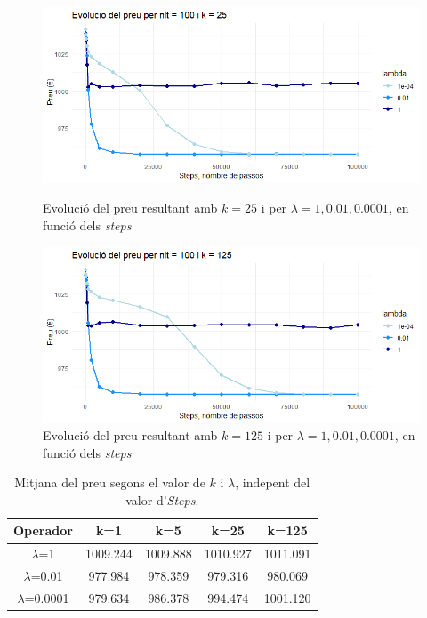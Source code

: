\documentclass[a4paper]{article}
\begin{document}
	\begin{figure}[H]
		\centering
		\begin{minipage}{0.45\textwidth}
			\centering
			\includegraphics[width=\textwidth]{images/exp3_k25.png}
			\caption{Evolució del preu resultant amb $k=25$ i per $\lambda = {1, 0.01, 0.0001}$, en funció dels \textit{steps}}
			\label{fig:exp3_k25}
		\end{minipage}%
		\hspace{0.05\textwidth} %
		\begin{minipage}{0.45\textwidth}
			\centering
			\includegraphics[width=\textwidth]{images/exp3_k125.png}
			\caption{Evolució del preu resultant amb $k=125$ i per $\lambda = {1,0.01,0.0001}$, en funció dels \textit{steps}}
			\label{fig:exp3_k125}
		\end{minipage}
	\end{figure}
	
	\begin{table}[H]
		\centering
		\begin{tabular}{|c|c|c|c|c|}
			\hline
			\textbf{Operador} & \textbf{k=1} & \textbf{k=5} & \textbf{k=25} & \textbf{k=125} \\
			\hline
			$\lambda$=1 & 1009.244 & 1009.888 & 1010.927 & 1011.091 \\
			\hline
			$\lambda$=0.01 & 977.984 & 978.359 & 979.316 & 980.069 \\
			\hline
			$\lambda$=0.0001 & 979.634 & 986.378 & 994.474 & 1001.120 \\
			\hline
		\end{tabular}
		\caption{Mitjana del preu segons el valor de $k$ i $\lambda$, indepent del valor d'\textit{Steps}.}
		\label{tab:exp3_estadisticas}
	\end{table}
	
\end{document}
